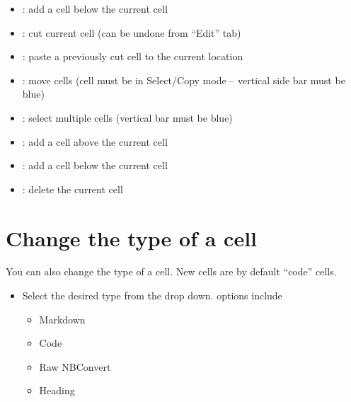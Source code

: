 \documentclass[letterpaper,10pt,english]{jupyterBook}
\begin{document}
\sphinxAtStartPar
{}
\begin{itemize}
\item {} 
\sphinxAtStartPar
{}: add a cell below the current cell

\item {} 
\sphinxAtStartPar
{}: cut  current cell (can be undone from “Edit” tab)

\item {} 
\sphinxAtStartPar
{}: paste a previously cut cell to the current location

\item {} 
\sphinxAtStartPar
{}: move cells (cell must be in Select/Copy mode – vertical side bar must be blue)

\item {} 
\sphinxAtStartPar
{}: select multiple cells (vertical bar must be blue)

\end{itemize}

\sphinxAtStartPar
{}
\begin{itemize}
\item {} 
\sphinxAtStartPar
{}: add a cell above the current cell

\item {} 
\sphinxAtStartPar
{}: add a cell below the current cell

\item {} 
\sphinxAtStartPar
{}: delete the current cell

\end{itemize}


\section{Change the type of a cell}
\label{\detokenize{content/04_PythonEssentials/Intro_Jupyter_notebook:change-the-type-of-a-cell}}
\sphinxAtStartPar
You can also change the type of a cell. New cells are by default “code” cells.

\sphinxAtStartPar
{}
\begin{itemize}
\item {} 
\sphinxAtStartPar
Select the desired type from the drop down.  options include
\begin{itemize}
\item {} 
\sphinxAtStartPar
Markdown

\item {} 
\sphinxAtStartPar
Code

\item {} 
\sphinxAtStartPar
Raw NBConvert

\item {} 
\sphinxAtStartPar
Heading

\end{itemize}

\end{itemize}
\end{document}
